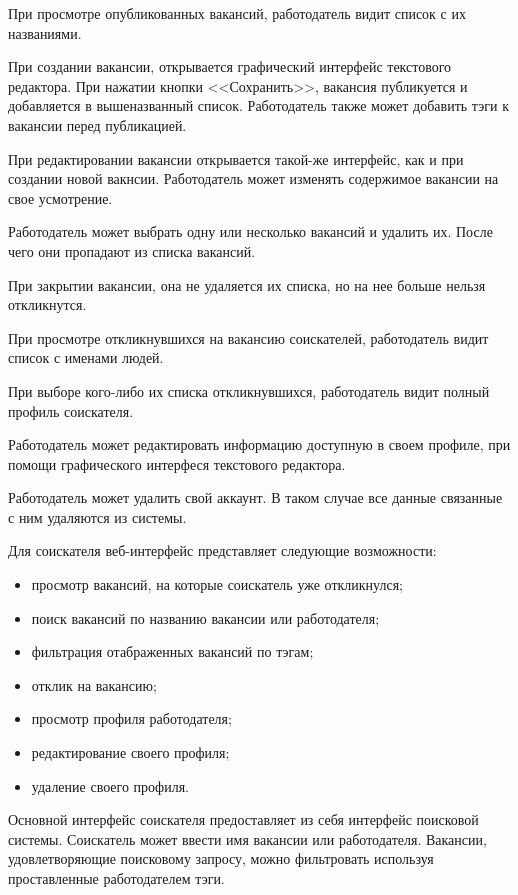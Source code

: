 \documentclass[a4page]{article}
\begin{document}
При просмотре опубликованных вакансий, работодатель видит список с их названиями.

При создании вакансии, открывается графический интерфейс текстового редактора. При нажатии кнопки <<Сохранить>>, вакансия публикуется и добавляется в вышеназванный список. Работодатель также может добавить тэги к вакансии перед публикацией.

При редактировании вакансии открывается такой-же интерфейс, как и при создании новой вакнсии. Работодатель может изменять содержимое вакансии на свое усмотрение.

Работодатель может выбрать одну или несколько вакансий и удалить их. После чего они пропадают из списка вакансий.

При закрытии вакансии, она не удаляется их списка, но на нее больше нельзя откликнутся.

При просмотре откликнувшихся на вакансию соискателей, работодатель видит список с именами людей.

При выборе кого-либо их списка откликнувшихся, работодатель видит полный профиль соискателя.

Работодатель может редактировать информацию доступную в своем профиле, при помощи графического интерфеся текстового редактора.

Работодатель может удалить свой аккаунт. В таком случае все данные связанные с ним удаляются из системы.

Для соискателя веб-интерфейс представляет следующие возможности:

\begin{itemize}
  \item просмотр вакансий, на которые соискатель уже откликнулся;
  \item поиск вакансий по названию вакансии или работодателя;
  \item фильтрация отабраженных вакансий по тэгам;
  \item отклик на вакансию;
  \item просмотр профиля работодателя;
  \item редактирование своего профиля;
  \item удаление своего профиля.
\end{itemize}

Основной интерфейс соискателя предоставляет из себя интерфейс поисковой системы. Соискатель может ввести имя вакансии или работодателя. Вакансии, удовлетворяющие поисковому запросу, можно фильтровать используя проставленные работодателем тэги.
\end{document}
